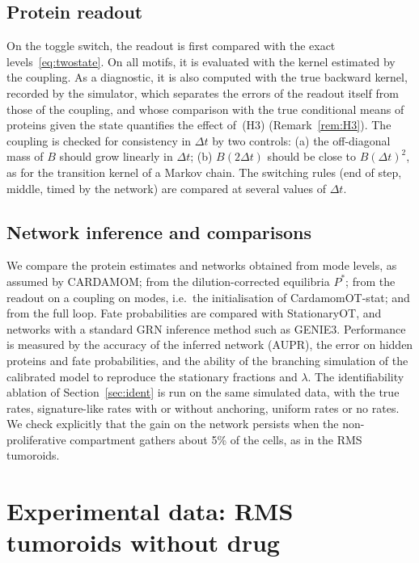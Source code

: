 \documentclass[a4paper, 11pt]{article}
\theoremstyle{plain}
\theoremstyle{remark}
\begin{document}
\subsection{Protein readout}

On the toggle switch, the readout is first compared with the exact levels~\eqref{eq:twostate}. On all motifs, it is evaluated with the kernel estimated by the coupling. As a diagnostic, it is also computed with the true backward kernel, recorded by the simulator, which separates the errors of the readout itself from those of the coupling, and whose comparison with the true conditional means of proteins given the state quantifies the effect of~(H3) (Remark~\ref{rem:H3}). The coupling is checked for consistency in $\Delta t$ by two controls: (a) the off-diagonal mass of $B$ should grow linearly in $\Delta t$; (b) $B(2\Delta t)$ should be close to $B(\Delta t)^2$, as for the transition kernel of a Markov chain. The switching rules (end of step, middle, timed by the network) are compared at several values of $\Delta t$.

\subsection{Network inference and comparisons}

We compare the protein estimates and networks obtained from mode levels, as assumed by CARDAMOM; from the dilution-corrected equilibria $P^\ast$; from the readout on a coupling on modes, i.e.\ the initialisation of CardamomOT-stat; and from the full loop. Fate probabilities are compared with StationaryOT, and networks with a standard GRN inference method such as GENIE3. Performance is measured by the accuracy of the inferred network (AUPR), the error on hidden proteins and fate probabilities, and the ability of the branching simulation of the calibrated model to reproduce the stationary fractions and $\lambda$. The identifiability ablation of Section~\ref{sec:ident} is run on the same simulated data, with the true rates, signature-like rates with or without anchoring, uniform rates or no rates. We check explicitly that the gain on the network persists when the non-proliferative compartment gathers about 5\% of the cells, as in the RMS tumoroids.

\section{Experimental data: RMS tumoroids without drug}\label{sec:data}
\end{document}
